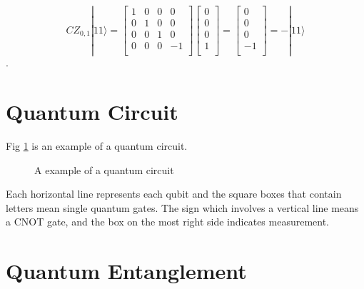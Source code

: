 \begin{equation}
CZ_{0,1}|11\rangle = 
\begin{bmatrix}
  1 & 0 & 0 & 0 \\
  0 & 1 & 0 & 0 \\
  0 & 0 & 1 & 0 \\
  0 & 0 & 0 & -1 \\
  \end{bmatrix}
 \left[
\begin{array}{c}
0 \\
0 \\
0 \\
1 \\
\end{array}
\right]
=  \left[
\begin{array}{c}
0 \\
0 \\
0 \\
-1 \\
\end{array}
\right] 
= -|11\rangle 
\end{equation}.



\section{Quantum Circuit}
Fig \ref{background:example-circuit} is an example of a quantum circuit.

\begin{figure}[ht]
  \begin{center}
\caption{A example of a quantum circuit}
\end{center}
\label{background:example-circuit}
\end{figure}

Each horizontal line represents each qubit and the square boxes that contain letters mean single quantum gates.  The sign which involves a vertical line means a CNOT gate, and the box on the most right side indicates measurement. 

\section{Quantum Entanglement}

